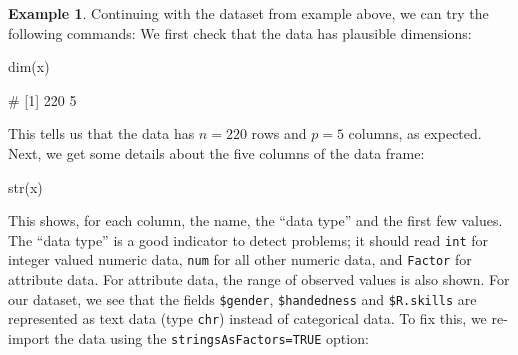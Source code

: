 \documentclass[
  a4paper,
]{article}
\newenvironment{Shaded}{\begin{snugshade}}{\end{snugshade}}
\newcommand{\FunctionTok}[1]{\textcolor[rgb]{0.00,0.00,0.00}{#1}}
\newcommand{\NormalTok}[1]{#1}
\theoremstyle{definition}
\theoremstyle{definition}
\newtheorem{example}{Example}[section]
\theoremstyle{definition}
\theoremstyle{definition}
\theoremstyle{remark}
\begin{document}
\begin{example}
Continuing with the dataset from example above, we can try the following
commands: We first check that the data has plausible dimensions:

\begin{Shaded}
\begin{Highlighting}[]
\FunctionTok{dim}\NormalTok{(x)}
\end{Highlighting}
\end{Shaded}

\begin{Shaded}
\begin{Highlighting}[]
\NormalTok{\# [1] 220   5}
\end{Highlighting}
\end{Shaded}

This tells us that the data has \(n=220\) rows and \(p=5\) columns, as expected.
Next, we get some details about the five columns of the data frame:

\begin{Shaded}
\begin{Highlighting}[]
\FunctionTok{str}\NormalTok{(x)}
\end{Highlighting}
\end{Shaded}

\begin{Shaded}
\end{Shaded}

This shows, for each column, the name, the ``data type'' and the
first few values. The ``data type'' is a good indicator to detect
problems; it should read \texttt{int} for integer valued numeric data,
\texttt{num} for all other numeric data, and \texttt{Factor} for
attribute data. For attribute data, the range of observed values is
also shown. For our dataset, we see that the fields \texttt{\$gender},
\texttt{\$handedness} and \texttt{\$R.skills} are represented as text data (type \texttt{chr})
instead of categorical data. To fix this, we re-import the data
using the \texttt{stringsAsFactors=TRUE} option:


\end{example}
\end{document}
